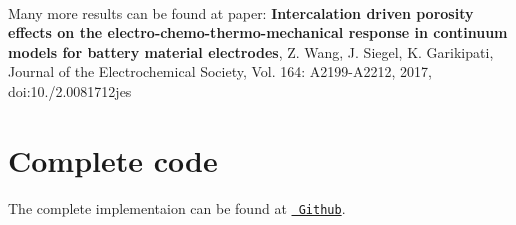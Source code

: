    ~\newline
 

Many more results can be found at paper\+: {\bfseries{Intercalation driven porosity effects on the electro-\/chemo-\/thermo-\/mechanical response in continuum models for battery material electrodes}}, Z. Wang, J. Siegel, K. Garikipati, Journal of the Electrochemical Society, Vol. 164\+: A2199-\/\+A2212, 2017, doi\+:10./2.0081712jes \hypertarget{brain_morph_com}{}\section{Complete code}\label{brain_morph_com}
The complete implementaion can be found at \href{https://github.com/mechanoChem/mechanoChemFEM/tree/example/Example2%20Battery%20model%20at%20electrode%20scale}{\texttt{ Github}}. 